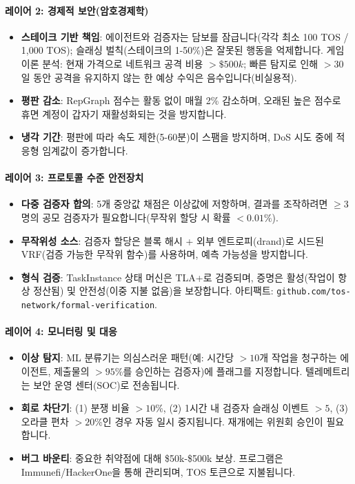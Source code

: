 \documentclass[11pt]{article}
\begin{document}
\paragraph{레이어 2: 경제적 보안(암호경제학)}
\begin{itemize}[noitemsep]
  \item \textbf{스테이크 기반 책임}: 에이전트와 검증자는 담보를 잠급니다(각각 최소 100 TOS / 1,000 TOS); 슬래싱 벌칙(스테이크의 1-50\%)은 잘못된 행동을 억제합니다. 게임 이론 분석: 현재 가격으로 네트워크 공격 비용 $>\$500k$; 빠른 탐지로 인해 $>30$일 동안 공격을 유지하지 않는 한 예상 수익은 음수입니다(비실용적).
  \item \textbf{평판 감소}: RepGraph 점수는 활동 없이 매월 2\% 감소하며, 오래된 높은 점수로 휴면 계정이 갑자기 재활성화되는 것을 방지합니다.
  \item \textbf{냉각 기간}: 평판에 따라 속도 제한(5-60분)이 스팸을 방지하며, DoS 시도 중에 적응형 임계값이 증가합니다.
\end{itemize}

\paragraph{레이어 3: 프로토콜 수준 안전장치}
\begin{itemize}[noitemsep]
  \item \textbf{다중 검증자 합의}: 5개 중앙값 채점은 이상값에 저항하며, 결과를 조작하려면 $\geq3$명의 공모 검증자가 필요합니다(무작위 할당 시 확률 $<0.01\%$).
  \item \textbf{무작위성 소스}: 검증자 할당은 블록 해시 + 외부 엔트로피(drand)로 시드된 VRF(검증 가능한 무작위 함수)를 사용하며, 예측 가능성을 방지합니다.
  \item \textbf{형식 검증}: TaskInstance 상태 머신은 TLA+로 검증되며, 증명은 활성(작업이 항상 정산됨) 및 안전성(이중 지불 없음)을 보장합니다. 아티팩트: \texttt{github.com/tos-network/formal-verification}.
\end{itemize}

\paragraph{레이어 4: 모니터링 및 대응}
\begin{itemize}[noitemsep]
  \item \textbf{이상 탐지}: ML 분류기는 의심스러운 패턴(예: 시간당 $>10$개 작업을 청구하는 에이전트, 제출물의 $>95\%$를 승인하는 검증자)에 플래그를 지정합니다. 텔레메트리는 보안 운영 센터(SOC)로 전송됩니다.
  \item \textbf{회로 차단기}: (1) 분쟁 비율 $>10\%$, (2) 1시간 내 검증자 슬래싱 이벤트 $>5$, (3) 오라클 편차 $>20\%$인 경우 자동 일시 중지됩니다. 재개에는 위원회 승인이 필요합니다.
  \item \textbf{버그 바운티}: 중요한 취약점에 대해 \$50k-\$500k 보상. 프로그램은 Immunefi/HackerOne을 통해 관리되며, TOS 토큰으로 지불됩니다.
\end{itemize}
\end{document}
